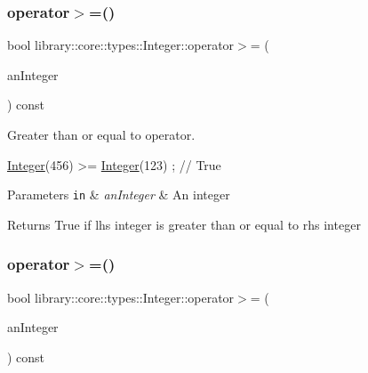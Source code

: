 \mbox{\label{classlibrary_1_1core_1_1types_1_1Integer_ae565ce34bef391725beebb42269d26fe}} 
\subsubsection{\texorpdfstring{operator$>$=()}{operator>=()}\hspace{0.1cm}{\footnotesize\ttfamily [1/2]}}
{\footnotesize\ttfamily bool library\+::core\+::types\+::\+Integer\+::operator$>$= (\begin{DoxyParamCaption}\item[{const \hyperlink{classlibrary_1_1core_1_1types_1_1Integer}{Integer} \&}]{an\+Integer }\end{DoxyParamCaption}) const}



Greater than or equal to operator. 


\begin{DoxyCode}
\hyperlink{classlibrary_1_1core_1_1types_1_1Integer_a6483b1c4e13e5ed6af5e7a58347efead}{Integer}(456) >= \hyperlink{classlibrary_1_1core_1_1types_1_1Integer_a6483b1c4e13e5ed6af5e7a58347efead}{Integer}(123) ; \textcolor{comment}{// True}
\end{DoxyCode}



\begin{DoxyParams}[1]{Parameters}
\mbox{\tt in}  & {\em an\+Integer} & An integer \\
\hline
\end{DoxyParams}
\begin{DoxyReturn}{Returns}
True if lhs integer is greater than or equal to rhs integer 
\end{DoxyReturn}
\mbox{\label{classlibrary_1_1core_1_1types_1_1Integer_a88077b530da644e33e6346837035eb9d}} 
\subsubsection{\texorpdfstring{operator$>$=()}{operator>=()}\hspace{0.1cm}{\footnotesize\ttfamily [2/2]}}
{\footnotesize\ttfamily bool library\+::core\+::types\+::\+Integer\+::operator$>$= (\begin{DoxyParamCaption}\item[{const \hyperlink{classlibrary_1_1core_1_1types_1_1Integer_a623afb1580f870fd8a1997b1c12c917d}{Integer\+::\+Value\+Type} \&}]{an\+Integer }\end{DoxyParamCaption}) const}

